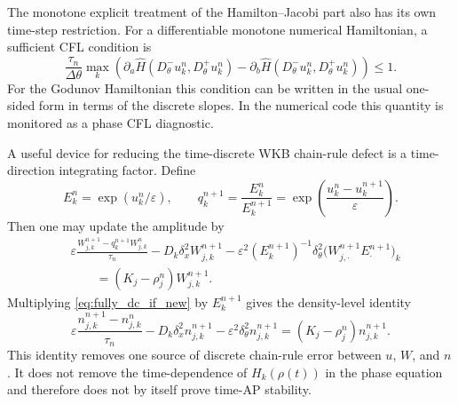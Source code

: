 \documentclass[11pt]{article}
\begin{document}
{The monotone explicit treatment of the Hamilton--Jacobi part also has its own time-step restriction. For a differentiable monotone numerical Hamiltonian, a sufficient CFL condition is
\begin{equation}\label{eq:phase_cfl_new}
    \frac{\tau_n}{\Delta\theta}
    \max_k\left(\partial_a\widehat H(D_\theta^-u_k^n,D_\theta^+u_k^n)
    -\partial_b\widehat H(D_\theta^-u_k^n,D_\theta^+u_k^n)\right)\le 1 .
\end{equation}
For the Godunov Hamiltonian this condition can be written in the usual one-sided form in terms of the discrete slopes. In the numerical code this quantity is monitored as a phase CFL diagnostic.

A useful device for reducing the time-discrete WKB chain-rule defect is a time-direction integrating factor. Define
\begin{equation}\label{eq:if_factor_new}
    E_k^n=\exp(u_k^n/\varepsilon),
    \qquad
    q_k^{n+1}=\frac{E_k^n}{E_k^{n+1}}
    =\exp\left(\frac{u_k^n-u_k^{n+1}}{\varepsilon}\right).
\end{equation}
Then one may update the amplitude by
\begin{equation}\label{eq:fully_dc_if_new}
\begin{aligned}
    &\varepsilon\frac{W_{j,k}^{n+1}-q_k^{n+1}W_{j,k}^n}{\tau_n}
    -D_k\delta_x^2W_{j,k}^{n+1}
    -\varepsilon^2(E_k^{n+1})^{-1}
      \delta_\theta^2\bigl(W_{j,\cdot}^{n+1}E_{\cdot}^{n+1}\bigr)_k  \\
    &\qquad = (K_j-\rho_j^n)W_{j,k}^{n+1}.
\end{aligned}
\end{equation}
Multiplying \eqref{eq:fully_dc_if_new} by \(E_k^{n+1}\) gives the density-level identity
\begin{equation}\label{eq:density_level_if_new}
    \varepsilon\frac{n_{j,k}^{n+1}-n_{j,k}^n}{\tau_n}
    -D_k\delta_x^2n_{j,k}^{n+1}
    -\varepsilon^2\delta_\theta^2n_{j,k}^{n+1}
    =(K_j-\rho_j^n)n_{j,k}^{n+1}.
\end{equation}
This identity removes one source of discrete chain-rule error between \(u\), \(W\), and \(n\). It does not remove the time-dependence of \(H_k(\rho(t))\) in the phase equation and therefore does not by itself prove time-AP stability.

}
\end{document}

